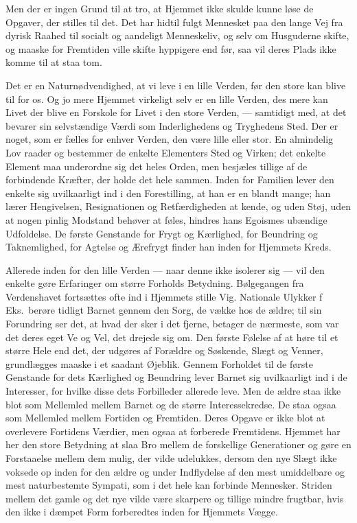 \documentclass[12pt,a4paper]{article}
\newcommand{\opage}[1]{\marginnote{\footnotesize\textit{[#1]}}}
\begin{document}
Men der er ingen Grund til at tro, at Hjemmet ikke skulde kunne løse de
Opgaver, der stilles til det. Det har hidtil fulgt Mennesket paa den lange Vej
fra dyrisk Raahed til socialt og aandeligt Menneskeliv, og selv om Husguderne
skifte, og maaske for Fremtiden
\opage{11}ville skifte hyppigere end før, saa vil deres
Plads ikke komme til at staa tom.

Det er en Naturnødvendighed, at vi leve i en lille Verden, før den store kan
blive til for os. Og jo mere Hjemmet virkeligt selv er en lille Verden, des
mere kan Livet der blive en Forskole for Livet i den store Verden, ---
samtidigt med, at det bevarer sin selvstændige Værdi som Inderlighedens og
Tryghedens Sted. Der er noget, som er fælles for enhver Verden, den være lille
eller stor. En almindelig Lov raader og bestemmer de enkelte Elementers Sted
og Virken; det enkelte Element maa underordne sig det heles Orden, men
besjæles tillige af de forbindende Kræfter, der holde det hele sammen. Inden
for Familien lever den enkelte sig uvilkaarligt ind i den Forestilling, at han
er en blandt mange; han lærer Hengivelsen, Resignationen og Retfærdigheden at
kende, og uden Støj, uden at nogen pinlig Modstand behøver at føles, hindres
hans Egoismes ubændige Udfoldelse. De første Genstande for Frygt og Kærlighed,
for Beundring og Taknemlighed, for Agtelse og Ærefrygt finder han inden for
Hjemmets Kreds.

Allerede inden for den lille Verden --- naar denne ikke isolerer sig --- vil
den enkelte gøre Erfaringer om større Forholds Betydning. Bølgegangen fra
Verdenshavet fortsættes ofte ind i Hjemmets stille Vig. Nationale Ulykker f Eks.\ berøre %
tidligt Barnet gennem den Sorg, de vække hos de ældre; til sin Forundring ser
det, at hvad der sker i det fjerne, betager de nærmeste, som var det deres
eget Ve og Vel, det drejede sig om. Den første Følelse af at høre til et
større Hele end det, der udgøres af Forældre og Søskende, Slægt og Venner,
grundlægges maaske i et saadant Øjeblik. Gennem Forholdet til de første
Genstande for dets Kærlighed og Beundring lever Barnet sig uvilkaarligt ind i
de Interesser, for hvilke disse dets Forbilleder allerede leve. Men de ældre
staa ikke blot som Mellemled mellem Barnet og de større Interessekredse. De
staa ogsaa som Mellemled mellem Fortiden og Fremtiden. Deres Opgave er ikke
blot at overlevere Fortidens Værdier, men ogsaa at forberede Fremtidens.
Hjemmet har her den store Betydning at slaa Bro mellem de forskellige
Generationer og gøre en Forstaae\-lse mellem dem mulig, der vilde udelukkes,
dersom den nye Slægt ikke voksede op inden for den ældre og under Indflydelse
af den mest umiddelbare og mest naturbestemte Sympati, som i det hele kan
forbinde Mennesker. Striden mellem det gamle og det nye vilde være skarpere og
tillige mindre frugtbar, hvis den ikke i dæmpet Form forberedtes inden for
Hjemmets Vægge.
\end{document}
